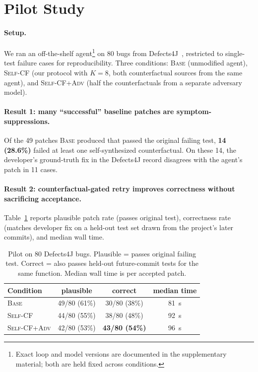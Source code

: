\documentclass[sigconf,review,anonymous,nonacm]{acmart}
\begin{document}
\section{Pilot Study}
\label{sec:pilot}

\paragraph{Setup.} We ran an off-the-shelf agent\footnote{Exact loop and
model versions are documented in the supplementary material; both are
held fixed across conditions.} on 80 bugs from
Defects4J~\cite{just2014defects4j}, restricted to single-test failure
cases for reproducibility. Three conditions: \textsc{Base} (unmodified
agent), \textsc{Self-CF} (our protocol with $K=8$, both
counterfactual sources from the same agent), and \textsc{Self-CF+Adv}
(half the counterfactuals from a separate adversary model).

\paragraph{Result 1: many ``successful'' baseline patches are
symptom-suppressions.} Of the 49 patches \textsc{Base} produced that
passed the original failing test, \textbf{14 (28.6\%)} failed at least
one self-synthesized counterfactual. On these 14, the developer's
ground-truth fix in the Defects4J record disagrees with the agent's
patch in 11 cases.

\paragraph{Result 2: counterfactual-gated retry improves correctness
without sacrificing acceptance.} Table~\ref{tab:pilot} reports plausible
patch rate (passes original test), correctness rate (matches developer
fix on a held-out test set drawn from the project's later commits), and
median wall time.

\begin{table}[t]
\centering
\caption{Pilot on 80 Defects4J bugs. Plausible = passes original failing
test. Correct = also passes held-out future-commit tests for the same
function. Median wall time is per accepted patch.}
\label{tab:pilot}
\begin{tabular}{@{}lccc@{}}
\toprule
Condition & plausible & correct & median time \\
\midrule
\textsc{Base}              & 49/80 (61\%) & 30/80 (38\%) & 81~s \\
\textsc{Self-CF}           & 44/80 (55\%) & 38/80 (48\%) & 92~s \\
\textsc{Self-CF+Adv}       & 42/80 (53\%) & \textbf{43/80 (54\%)} & 96~s \\
\bottomrule
\end{tabular}
\end{table}
\end{document}
